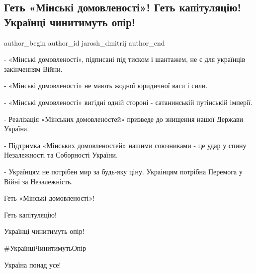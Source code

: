  
 
 
 
 
 
\subsection{Геть «Мінські домовленості»! Геть капітуляцію! Українці чинитимуть опір!}
\label{sec:08_12_2021.fb.jarosh_dmitrij.1.minsk_domovlenosti_getj}
 
\ifcmt
 author_begin
   author_id jarosh_dmitrij
 author_end
\fi

- «Мінські домовленості», підписані під тиском і шантажем, не є для українців
закінченням Війни.

- «Мінські домовленості» не мають жодної юридичної ваги і сили.

- «Мінські домовленості» вигідні одній стороні - сатанинській путінській
імперії.

- Реалізація «Мінських домовленостей» призведе до знищення нашої Держави
Україна.

- Підтримка «Мінських домовленостей» нашими союзниками - це удар у спину
Незалежності та Соборності України.

- Українцям не потрібен мир за будь-яку ціну. Украінцям потрібна Перемога у
Війні за Незалежність.

Геть «Мінські домовленості»!

Геть капітуляцію!

Українці чинитимуть опір!

\#УкраїнціЧинитимутьОпір

Україна понад усе!

